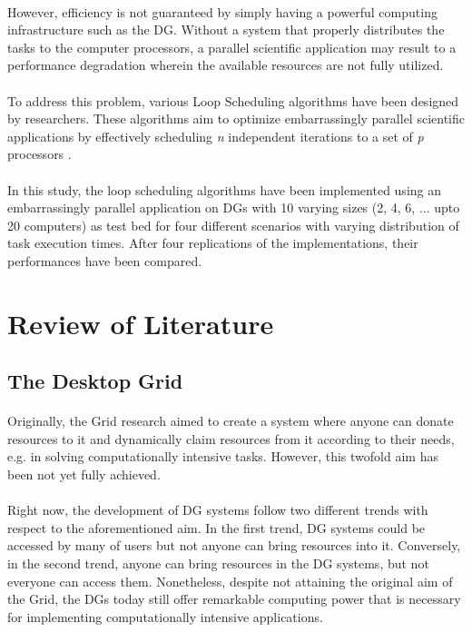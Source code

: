 \documentclass[10pt, twocolumn, letterpaper]{article}
\begin{document}
\paragraph{}
However, efficiency is not guaranteed by simply having a powerful computing infrastructure such as the DG. Without a system that properly distributes the tasks to the computer processors, a parallel scientific application may result to a performance degradation wherein the available resources are not fully utilized. 

\paragraph{}
To address this problem, various Loop Scheduling algorithms have been designed by researchers. These algorithms aim to optimize embarrassingly parallel scientific applications by effectively scheduling \textit{n} independent iterations to a set of \textit{p} processors \cite{tabirca}.

\paragraph{}
In this study, the loop scheduling algorithms have been implemented using an embarrassingly parallel application on DGs with 10 varying sizes (2, 4, 6, ... upto 20 computers) as test bed for four different scenarios with varying distribution of task execution times. After four replications of the implementations, their performances have been compared.

\section{Review of Literature}

\subsection{The Desktop Grid}

\paragraph{}
Originally, the Grid research aimed to create a system where anyone can donate resources to it and dynamically claim resources from it according to their needs, e.g. in solving computationally intensive tasks. However, this twofold aim has been not yet fully achieved.

\paragraph{}
Right now, the development of DG systems follow two different trends with respect to the aforementioned aim. In the first trend, DG systems could be accessed by many of users but not anyone can bring resources into it. Conversely, in the second trend, anyone can bring resources in the DG systems, but not everyone can access them. Nonetheless, despite not attaining the original aim of the Grid, the DGs today still offer remarkable computing power that is necessary for implementing computationally intensive applications.
\end{document}
